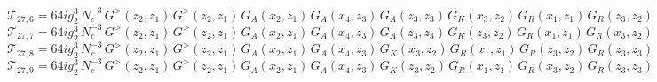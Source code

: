 \documentclass{article}
\begin{document}
\begin{equation*}
\mathcal{T}_{27,6} = 64 i g_{2}^{3}\,N_c^{-3}\,G^>\left(z_{2},z_{1}\right) \, G^>\left(z_{2},z_{1}\right) \, G_A\left(x_2,z_{1}\right) \, G_A\left(x_4,z_{3}\right) \, G_A\left(z_{3},z_{3}\right) \, G_K\left(x_3,z_{2}\right) \, G_R\left(x_1,z_{1}\right) \, G_R\left(z_{3},z_{2}\right)
\end{equation*}
\begin{equation*}
\mathcal{T}_{27,7} = 64 i g_{2}^{3}\,N_c^{-3}\,G^>\left(z_{2},z_{1}\right) \, G^>\left(z_{2},z_{1}\right) \, G_A\left(x_2,z_{1}\right) \, G_A\left(x_4,z_{3}\right) \, G_A\left(z_{3},z_{3}\right) \, G_K\left(z_{3},z_{2}\right) \, G_R\left(x_1,z_{1}\right) \, G_R\left(x_3,z_{2}\right)
\end{equation*}
\begin{equation*}
\mathcal{T}_{27,8} = 64 i g_{2}^{3}\,N_c^{-3}\,G^>\left(z_{2},z_{1}\right) \, G^>\left(z_{2},z_{1}\right) \, G_A\left(x_2,z_{1}\right) \, G_A\left(x_4,z_{3}\right) \, G_K\left(x_3,z_{2}\right) \, G_R\left(x_1,z_{1}\right) \, G_R\left(z_{3},z_{2}\right) \, G_R\left(z_{3},z_{3}\right)
\end{equation*}
\begin{equation*}
\mathcal{T}_{27,9} = 64 i g_{2}^{3}\,N_c^{-3}\,G^>\left(z_{2},z_{1}\right) \, G^>\left(z_{2},z_{1}\right) \, G_A\left(x_2,z_{1}\right) \, G_A\left(x_4,z_{3}\right) \, G_K\left(z_{3},z_{2}\right) \, G_R\left(x_1,z_{1}\right) \, G_R\left(x_3,z_{2}\right) \, G_R\left(z_{3},z_{3}\right)
\end{equation*}
\end{document}
